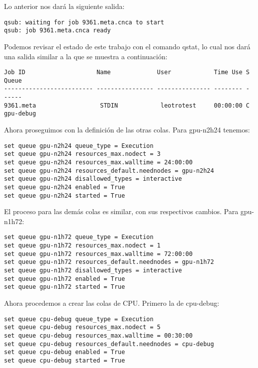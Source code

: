 Lo anterior nos dará la siguiente salida:

\begin{lstlisting}
qsub: waiting for job 9361.meta.cnca to start
qsub: job 9361.meta.cnca ready
\end{lstlisting}

Podemos revisar el estado de este trabajo con el comando qstat, lo cual nos dará una salida similar a la que se muestra a continuación:

\begin{lstlisting}
Job ID                    Name             User            Time Use S Queue
------------------------- ---------------- --------------- -------- - -----
9361.meta                  STDIN            leotrotest     00:00:00 C gpu-debug  
\end{lstlisting}

Ahora proseguimos con la definición de las otras colas. Para gpu-n2h24 tenemos:

\begin{lstlisting}
set queue gpu-n2h24 queue_type = Execution
set queue gpu-n2h24 resources_max.nodect = 3
set queue gpu-n2h24 resources_max.walltime = 24:00:00
set queue gpu-n2h24 resources_default.neednodes = gpu-n2h24
set queue gpu-n2h24 disallowed_types = interactive
set queue gpu-n2h24 enabled = True
set queue gpu-n2h24 started = True
\end{lstlisting}

El proceso para las demás colas  es similar, con sus respectivos cambios. Para gpu-n1h72:

\begin{lstlisting}
set queue gpu-n1h72 queue_type = Execution
set queue gpu-n1h72 resources_max.nodect = 1
set queue gpu-n1h72 resources_max.walltime = 72:00:00
set queue gpu-n1h72 resources_default.neednodes = gpu-n1h72
set queue gpu-n1h72 disallowed_types = interactive
set queue gpu-n1h72 enabled = True
set queue gpu-n1h72 started = True
\end{lstlisting}

Ahora procedemos a crear las colas de CPU. Primero la de  cpu-debug:

\begin{lstlisting}
set queue cpu-debug queue_type = Execution
set queue cpu-debug resources_max.nodect = 5
set queue cpu-debug resources_max.walltime = 00:30:00
set queue cpu-debug resources_default.neednodes = cpu-debug
set queue cpu-debug enabled = True
set queue cpu-debug started = True
\end{lstlisting}

